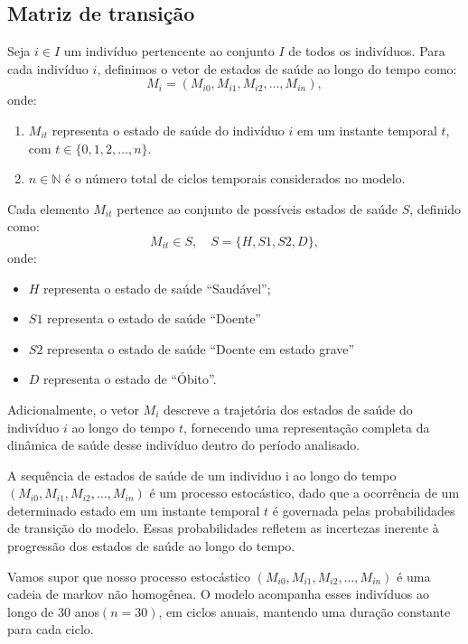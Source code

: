 \documentclass[12pt, a4paper, openany]{book}
\numberwithin{equation}{chapter}
\numberwithin{table}{chapter}
\numberwithin{figure}{chapter}
\theoremstyle{break}
\begin{document}
\subsection{Matriz de transição}

Seja \( i \in I \) um indivíduo pertencente ao conjunto \( I \) de todos os indivíduos. Para cada indivíduo \( i \), definimos o vetor de estados de saúde ao longo do tempo como:
\[
M_i = (M_{i0}, M_{i1}, M_{i2}, \ldots, M_{in}),
\]
onde:
\begin{enumerate}
    \item \( M_{it} \) representa o estado de saúde do indivíduo \( i \) em um instante temporal \( t \), com \( t \in \{0, 1, 2, \ldots, n\} \).
    \item \( n \in \mathbb{N} \) é o número total de ciclos temporais considerados no modelo.
\end{enumerate}

Cada elemento \( M_{it} \) pertence ao conjunto de possíveis estados de saúde \( S \), definido como:
\[
M_{it} \in S, \quad S = \{H, S1, S2, D\},
\]
onde:
\begin{itemize}
    \item \( H \) representa o estado de saúde ``Saudável'';
    \item \( S1 \) representa o estado de saúde ``Doente''

    \item \( S2 \) representa o estado de saúde ``Doente em estado grave''
    
    \item \( D \) representa o estado de  ``Óbito''.
\end{itemize}

Adicionalmente, o vetor \( M_i \) descreve a trajetória dos estados de saúde do indivíduo \( i \) ao longo do tempo \( t \), fornecendo uma representação completa da dinâmica de saúde desse indivíduo dentro do período analisado.

A sequência de estados de saúde de um individuo i ao longo do tempo $(M_{i0}, M_{i1}, M_{i2}, \ldots, M_{in})$  é  um processo estocástico, dado que a ocorrência de um determinado estado em um instante temporal $t$ é governada pelas probabilidades de transição do modelo. Essas probabilidades refletem as  incertezas inerente à progressão dos estados de saúde ao longo do tempo.



Vamos supor que nosso processo estocástico $(M_{i0}, M_{i1}, M_{i2}, \ldots, M_{in})$ é uma cadeia de markov não homogênea. O modelo acompanha esses indivíduos ao longo de 30 anos$(n = 30)$, em ciclos anuais, mantendo uma duração constante para cada ciclo.
\end{document}
